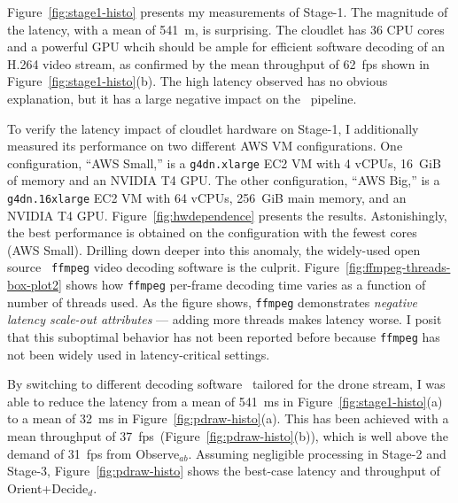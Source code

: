 Figure~\ref{fig:stage1-histo} presents my measurements of Stage-1. The magnitude of the latency, with a mean of 541~m, is surprising.
The cloudlet has 36 CPU cores and a powerful GPU whcih should be
ample for efficient software decoding of an H.264 video stream, as
confirmed by the mean throughput of 62~fps shown in
Figure~\ref{fig:stage1-histo}(b).  The high latency observed has no
obvious explanation, but it has a large negative impact on the
\ooda~pipeline.

To verify the latency impact of cloudlet hardware on Stage-1, I
additionally measured its performance on two different AWS VM
configurations.  One configuration, ``AWS Small,'' is a
\texttt{g4dn.xlarge} EC2 VM with 4 vCPUs, 16~GiB of memory and an
NVIDIA T4 GPU.  The other configuration, ``AWS Big,'' is a
\texttt{g4dn.16xlarge} EC2 VM with 64 vCPUs, 256~GiB main memory, and
an NVIDIA T4 GPU.  Figure~\ref{fig:hwdependence} presents the results.  Astonishingly, the best performance is obtained on the
configuration with the fewest cores (AWS Small).  Drilling down deeper
into this anomaly, the widely-used open source {\tt
  ffmpeg} video decoding software is the culprit.
Figure~\ref{fig:ffmpeg-threads-box-plot2} shows how {\tt ffmpeg}
per-frame decoding time varies as a function of number of threads
used.  As the figure shows, {\tt ffmpeg} demonstrates {\em negative
  latency scale-out attributes} --- adding more threads makes latency
worse. I posit that this suboptimal behavior has not been
reported before because {\tt ffmpeg} has not been widely used in
latency-critical settings.

By switching to  different decoding software~\cite{PDrAW2024} tailored for the drone stream, I was able to reduce the latency from a mean of 541~ms in
Figure~\ref{fig:stage1-histo}(a) to a mean of 32~ms in
Figure~\ref{fig:pdraw-histo}(a).  This has been achieved with a mean
throughput of 37~fps~(Figure~\ref{fig:pdraw-histo}(b)), which is well above
the demand of 31~fps from Observe$_{ab}$.  Assuming negligible
processing in Stage-2 and Stage-3, Figure~\ref{fig:pdraw-histo} shows
the best-case latency and throughput of Orient+Decide$_d$.

